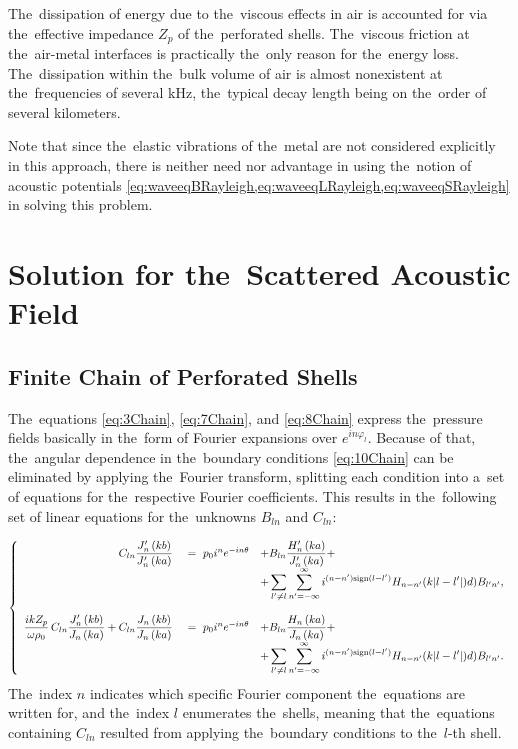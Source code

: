 The~dissipation of energy due to the~viscous effects in air is accounted for via the~effective impedance $Z_p$ of the~perforated shells.
The~viscous friction at the~air-metal interfaces is practically the~only reason for the~energy loss.
The~dissipation within the~bulk volume of air is almost nonexistent at the~frequencies of several kHz, the~typical decay length being on the~order of several kilometers.

Note that since the~elastic vibrations of the~metal are not considered explicitly in this approach, there is neither need nor advantage in using the~notion of acoustic potentials \cref{eq:waveeqBRayleigh,eq:waveeqLRayleigh,eq:waveeqSRayleigh} in solving this problem.


\section{Solution for the~Scattered Acoustic Field}

\subsection{Finite Chain of Perforated Shells}

The~equations \cref{eq:3Chain}, \cref{eq:7Chain}, and \cref{eq:8Chain} express the~pressure fields basically in the~form of Fourier expansions over $e^{in\varphi_l}$.
Because of that, the~angular dependence in the~boundary conditions \cref{eq:10Chain} can be eliminated by applying the~Fourier transform,
splitting each condition into a~set of equations for the~respective Fourier coefficients.
This results in the~following set of linear equations for the~unknowns $B_{ln}$ and $C_{ln}$:

\begin{equation}
\label{eq:11Chain}
\left\{
\begin{array}{rll}
C_{ln} \dfrac{J'_{n}\left(k b\right)}{J'_{n}\left(k a\right)}~&=~p_0 i^n e^{-i n\theta} &+ B_{ln} \dfrac{H'_{n}\left(k a\right)}{J'_{n}\left(k a\right)} + \\
& &+ \dsum\limits_{l' \neq l} \dsum\limits_{n'=-\infty}^{\infty} i^{(n-n')\sign(l-l')}H_{n-n'}(k|l-l'|)d) B_{l'n'},\\
 & & \\
%
%
\dfrac{i k Z_p}{\omega\rho_0}\,C_{ln} \dfrac{J'_{n}\left(k b\right)}{J_{n}\left(k a\right)} + C_{ln} \dfrac{J_{n}\left(k b\right)}{J_{n}\left(k a\right)}~&=~p_0 i^n e^{-i n\theta} &+ B_{ln} \dfrac{H_{n}\left(k a\right)}{J_n\left(k a\right)} + \\
& &+ \dsum\limits_{l' \neq l} \dsum\limits_{n'=-\infty}^{\infty} i^{(n-n')\sign(l-l')}H_{n-n'}(k|l-l'|)d) B_{l'n'}.\\
\end{array}
\right.
\end{equation}
The~index $n$ indicates which specific Fourier component the~equations are written for, and the~index $l$ enumerates the~shells, meaning that the~equations containing $C_{ln}$ resulted from applying the~boundary conditions to the~$l$-th shell.

